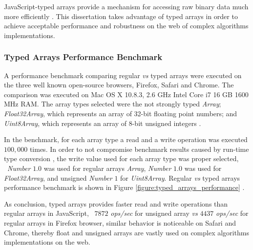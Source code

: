 JavaScript-typed arrays provide a mechanism for accessing raw binary data much more efficiently \cite{MDN2013,TypedArray2013}. This dissertation takes advantage of typed arrays in order to achieve acceptable performance and robustness on the web of complex algorithms implementations.

\subsubsection{Typed Arrays Performance Benchmark} %
\label{subsub:basic_concepts:web:javascript_typed_arrays:typed_arrays_performance_benchmark}

A performance benchmark comparing regular \textit{vs} typed arrays were executed on the three well known open-source browsers, Firefox, Safari and Chrome. The comparison was executed on Mac OS X 10.8.3, 2.6 GHz Intel Core i7 16 GB 1600 MHz RAM. The array types selected were the not strongly typed \textit{Array}; \textit{Float32Array}, which represents an array of 32-bit floating point numbers; and \textit{Uint8Array}, which represents an array of 8-bit unsigned integers \cite{MDN2013}.

In the benchmark, for each array type a read and a write operation was executed $100,000$ times. In order to not compromise benchmark results caused by run-time type conversion \cite{International2009}, the write value used for each array type was proper selected, \eg\ \textit{Number} $1.0$ was used for regular arrays \textit{Array}, \textit{Number} $1.0$ was used for \textit{Float32Array}, and unsigned \textit{Number} $1$ for \textit{Uint8Array}. Regular \textit{vs} typed arrays performance benchmark is shown in Figure \ref{figure:typed_arrays_performance} \cite{TypedArrayPerformance2013}.

As conclusion, typed arrays provides faster read and write operations than regular arrays in JavaScript, \ie\ $7872$ \textit{ops/sec} for unsigned array \textit{vs} $4437$ \textit{ops/sec} for regular arrays in Firefox browser, similar behavior is noticeable on Safari and Chrome, thereby float and unsigned arrays are vastly used on complex algorithms implementations on the web.

